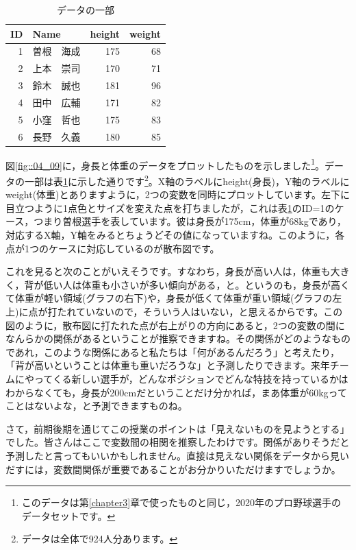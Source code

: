 \documentclass{ltjsbook}
\begin{document}
\begin{table}[ht]
    \centering
    \caption{データの一部} 
    \begin{tabular}{rlrr}
   ID  & Name & height & weight \\ 
      \hline
    1 & 曽根　海成 & 175 &  68 \\ 
      2 & 上本　崇司 & 170 &  71 \\ 
      3 & 鈴木　誠也 & 181 &  96 \\ 
      4 & 田中　広輔 & 171 &  82 \\ 
      5 & 小窪　哲也 & 175 &  83 \\ 
      6 & 長野　久義 & 180 &  85 \\ 
       \hline
    \end{tabular}
    \label{tab::04_04}
    \end{table}

図\ref{fig::04_09}に，身長と体重のデータをプロットしたものを示しました\footnote{このデータは第\ref{chapter3}章で使ったものと同じ，2020年のプロ野球選手のデータセットです。}。データの一部は表\ref{tab::04_04}に示した通りです\footnote{データは全体で924人分あります。}。X軸のラベルにheight(身長)，Y軸のラベルにweight(体重)とありますように，2つの変数を同時にプロットしています。左下に目立つように1点色とサイズを変えた点を打ちましたが，これは表\ref{tab::04_04}のID=1のケース，つまり曽根選手を表しています。彼は身長が175cm，体重が68kgであり，対応するX軸，Y軸をみるとちょうどその値になっていますね。このように，各点が1つのケースに対応しているのが散布図です。

これを見ると次のことがいえそうです。すなわち，身長が高い人は，体重も大きく，背が低い人は体重も小さいが多い傾向がある，と。というのも，身長が高くて体重が軽い領域(グラフの右下)や，身長が低くて体重が重い領域(グラフの左上)に点が打たれていないので，そういう人はいない，と思えるからです。この図のように，散布図に打たれた点が右上がりの方向にあると，2つの変数の間になんらかの関係があるということが推察できますね。その関係がどのようなものであれ，このような関係にあると私たちは「何があるんだろう」と考えたり，「背が高いということは体重も重いだろうな」と予測したりできます。来年チームにやってくる新しい選手が，どんなポジションでどんな特技を持っているかはわからなくても，身長が200cmだということだけ分かれば，まあ体重が60kgってことはないよな，と予測できますものね。

さて，前期後期を通じてこの授業のポイントは「見えないものを見ようとする」でした。皆さんはここで変数間の相関を推察したわけです。関係がありそうだと予測したと言ってもいいかもしれません。直接は見えない関係をデータから見いだすには，変数間関係が重要であることがお分かりいただけますでしょうか。
\end{document}
